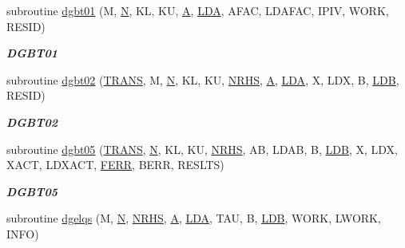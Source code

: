 \begin{DoxyCompactItemize}
subroutine \hyperlink{group__double__lin_ga58029fe2449d9fb6aceae0ed51549d2b}{dgbt01} (M, \hyperlink{polmisc_8c_a0240ac851181b84ac374872dc5434ee4}{N}, K\+L, K\+U, \hyperlink{classA}{A}, \hyperlink{example__user_8c_ae946da542ce0db94dced19b2ecefd1aa}{L\+D\+A}, A\+F\+A\+C, L\+D\+A\+F\+A\+C, I\+P\+I\+V, W\+O\+R\+K, R\+E\+S\+I\+D)
\begin{DoxyCompactList}\small\item\em {\bfseries D\+G\+B\+T01} \end{DoxyCompactList}\item 
subroutine \hyperlink{group__double__lin_ga9961b1e9c1b2e79d626e8276332f7189}{dgbt02} (\hyperlink{superlu__enum__consts_8h_a0c4e17b2d5cea33f9991ccc6a6678d62a1f61e3015bfe0f0c2c3fda4c5a0cdf58}{T\+R\+A\+N\+S}, M, \hyperlink{polmisc_8c_a0240ac851181b84ac374872dc5434ee4}{N}, K\+L, K\+U, \hyperlink{example__user_8c_aa0138da002ce2a90360df2f521eb3198}{N\+R\+H\+S}, \hyperlink{classA}{A}, \hyperlink{example__user_8c_ae946da542ce0db94dced19b2ecefd1aa}{L\+D\+A}, X, L\+D\+X, B, \hyperlink{example__user_8c_a50e90a7104df172b5a89a06c47fcca04}{L\+D\+B}, R\+E\+S\+I\+D)
\begin{DoxyCompactList}\small\item\em {\bfseries D\+G\+B\+T02} \end{DoxyCompactList}\item 
subroutine \hyperlink{group__double__lin_ga9790482176686c2279bbef343de99527}{dgbt05} (\hyperlink{superlu__enum__consts_8h_a0c4e17b2d5cea33f9991ccc6a6678d62a1f61e3015bfe0f0c2c3fda4c5a0cdf58}{T\+R\+A\+N\+S}, \hyperlink{polmisc_8c_a0240ac851181b84ac374872dc5434ee4}{N}, K\+L, K\+U, \hyperlink{example__user_8c_aa0138da002ce2a90360df2f521eb3198}{N\+R\+H\+S}, A\+B, L\+D\+A\+B, B, \hyperlink{example__user_8c_a50e90a7104df172b5a89a06c47fcca04}{L\+D\+B}, X, L\+D\+X, X\+A\+C\+T, L\+D\+X\+A\+C\+T, \hyperlink{superlu__enum__consts_8h_af00a42ecad444bbda75cde1b64bd7e72a78fd14d7abebae04095cfbe02928f153}{F\+E\+R\+R}, B\+E\+R\+R, R\+E\+S\+L\+T\+S)
\begin{DoxyCompactList}\small\item\em {\bfseries D\+G\+B\+T05} \end{DoxyCompactList}\item 
subroutine \hyperlink{group__double__lin_gaf0285d60d2ab48e4f2c676c7d93318bb}{dgelqs} (M, \hyperlink{polmisc_8c_a0240ac851181b84ac374872dc5434ee4}{N}, \hyperlink{example__user_8c_aa0138da002ce2a90360df2f521eb3198}{N\+R\+H\+S}, \hyperlink{classA}{A}, \hyperlink{example__user_8c_ae946da542ce0db94dced19b2ecefd1aa}{L\+D\+A}, T\+A\+U, B, \hyperlink{example__user_8c_a50e90a7104df172b5a89a06c47fcca04}{L\+D\+B}, W\+O\+R\+K, L\+W\+O\+R\+K, I\+N\+F\+O)

\end{DoxyCompactItemize}
